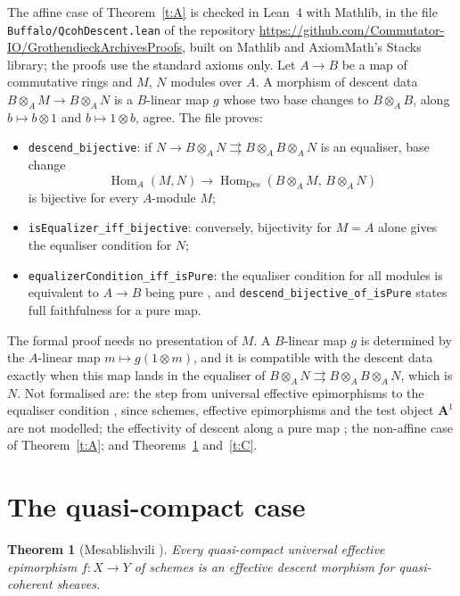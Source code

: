 \documentclass[11pt,a4paper]{amsart}
\newtheorem{theorem}{Theorem}[section]
\theoremstyle{definition}
\theoremstyle{remark}
\newcommand{\Des}{\mathrm{Des}}
\newcommand{\Hom}{\operatorname{Hom}}
\begin{document}
The affine case of Theorem~\ref{t:A} is checked in Lean~4 with Mathlib, in the file \texttt{Buffalo/\allowbreak QcohDescent.lean} of the repository \url{https://github.com/Commutator-IO/GrothendieckArchivesProofs}, built on Mathlib and AxiomMath's Stacks library; the proofs use the standard axioms only. Let $A\to B$ be a map of commutative rings and $M$, $N$ modules over $A$. A morphism of descent data $B\otimes_AM\to B\otimes_AN$ is a $B$-linear map $g$ whose two base changes to $B\otimes_AB$, along $b\mapsto b\otimes1$ and $b\mapsto1\otimes b$, agree. The file proves:
\begin{itemize}
\item \texttt{descend\_bijective}: if $N\to B\otimes_AN\rightrightarrows B\otimes_AB\otimes_AN$ is an equaliser, base change
\[\Hom_A(M,N)\to\Hom_{\Des}(B\otimes_AM,\,B\otimes_AN)\]
is bijective for every $A$-module $M$;
\item \texttt{isEqualizer\_iff\_bijective}: conversely, bijectivity for $M=A$ alone gives the equaliser condition for $N$;
\item \texttt{equalizerCondition\_iff\_isPure}: the equaliser condition for all modules is equivalent to $A\to B$ being pure \cite[08WE]{stacks}, and \texttt{descend\_bijective\_of\_isPure} states full faithfulness for a pure map.
\end{itemize}
The formal proof needs no presentation of $M$. A $B$-linear map $g$ is determined by the $A$-linear map $m\mapsto g(1\otimes m)$, and it is compatible with the descent data exactly when this map lands in the equaliser of $B\otimes_AN\rightrightarrows B\otimes_AB\otimes_AN$, which is $N$. Not formalised are: the step from universal effective epimorphisms to the equaliser condition \cite[0EUA]{stacks}, since schemes, effective epimorphisms and the test object $\mathbf A^1$ are not modelled; the effectivity of descent along a pure map \cite[08XA]{stacks}; the non-affine case of Theorem~\ref{t:A}; and Theorems~\ref{t:B} and~\ref{t:C}.

\section{The quasi-compact case}\label{sec:B}

\begin{theorem}[Mesablishvili \cite{mesablishvili-acs,mesablishvili2004}]\label{t:B}
Every quasi-compact universal effective epimorphism $f\colon X\to Y$ of schemes is an effective descent morphism for quasi-coherent sheaves.
\end{theorem}
\end{document}
